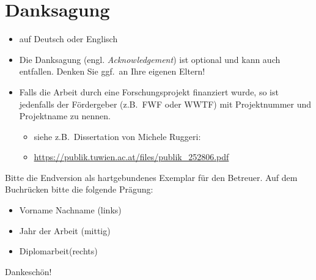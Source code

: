 \documentclass[a4paper,11pt,bibliography=totoc,listof=totoc,headinclude=true,cleardoublepage=empty,oneside]{NumPDEsThesis}
\begin{document}
\cleardoublepage


\chapter*{Danksagung} %
\thispagestyle{empty}

\begin{itemize}
  \item auf Deutsch oder Englisch
  \item Die Danksagung (engl. {\em Acknowledgement}) ist optional und kann auch entfallen. Denken Sie ggf.\ an Ihre eigenen Eltern!

  \item Falls die Arbeit durch eine Forschungsprojekt finanziert wurde, so ist jedenfalls der Fördergeber (z.B.\ FWF oder WWTF) mit Projektnummer und Projektname zu nennen.
        \begin{itemize}
          \item siehe z.B.\ Dissertation von Michele Ruggeri:
          \item[] \href{https://publik.tuwien.ac.at/files/publik_252806.pdf}{\ttfamily https://publik.tuwien.ac.at/files/publik\_252806.pdf}
        \end{itemize}

\end{itemize}

\vfill

Bitte die Endversion als hartgebundenes Exemplar für den Betreuer. Auf dem Buch\-rücken bitte die folgende Prägung:
\begin{itemize}
  \item Vorname Nachname (links)
  \item Jahr der Arbeit (mittig)
  \item Diplomarbeit(rechts)
\end{itemize}
Dankeschön!

\cleardoublepage

\end{document}
